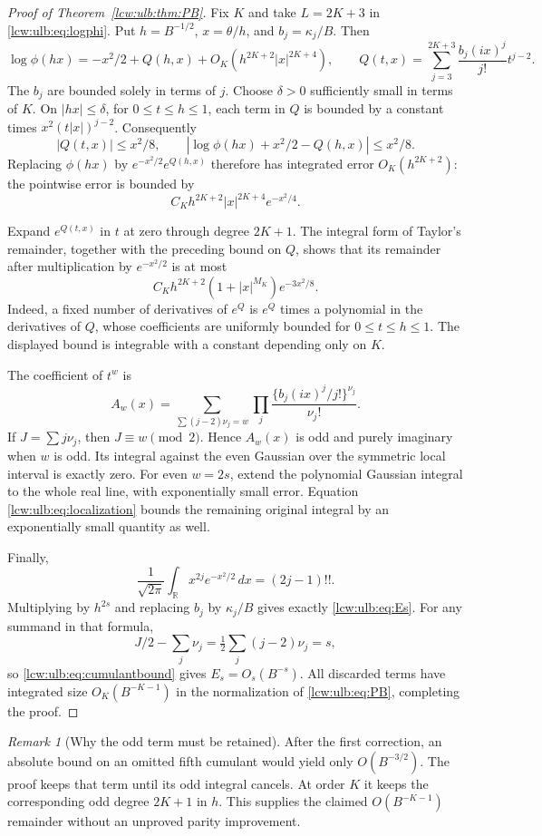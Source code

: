 \documentclass[11pt,letterpaper]{article}
\theoremstyle{remark}\newtheorem{remark}[theorem]{Remark}
\newcommand{\R}{\mathbb R}
\begin{document}
\begin{proof}[Proof of Theorem~\ref{lcw:ulb:thm:PB}]
Fix $K$ and take $L=2K+3$ in \eqref{lcw:ulb:eq:logphi}. Put
$h=B^{-1/2}$, $x=\theta/h$, and $b_j=\kappa_j/B$. Then
\[
 \log\phi(hx)=-x^2/2+Q(h,x)
      +O_K(h^{2K+2}|x|^{2K+4}),
 \qquad
 Q(t,x)=\sum_{j=3}^{2K+3}\frac{b_j(ix)^j}{j!}t^{j-2}.
\]
The $b_j$ are bounded solely in terms of $j$. Choose $\delta>0$
sufficiently small in terms of $K$. On $|hx|\le\delta$, for
$0\le t\le h\le1$, each term in $Q$ is bounded by a constant
times $x^2(t|x|)^{j-2}$. Consequently
\[
 |Q(t,x)|\le x^2/8,
 \qquad
 |\log\phi(hx)+x^2/2-Q(h,x)|\le x^2/8.
\]
Replacing $\phi(hx)$ by $e^{-x^2/2}e^{Q(h,x)}$ therefore has
integrated error $O_K(h^{2K+2})$: the pointwise error is bounded by
\[
 C_K h^{2K+2}|x|^{2K+4}e^{-x^2/4}.
\]

Expand $e^{Q(t,x)}$ in $t$ at zero through degree $2K+1$.
The integral form of Taylor's remainder, together with the preceding
bound on $Q$, shows that its remainder after multiplication by
$e^{-x^2/2}$ is at most
\[
 C_Kh^{2K+2}(1+|x|^{M_K})e^{-3x^2/8}.
\]
Indeed, a fixed number of derivatives of $e^Q$ is $e^Q$ times
a polynomial in the derivatives of $Q$, whose coefficients are
uniformly bounded for $0\le t\le h\le1$. The displayed bound
is integrable with a constant depending only on $K$.

The coefficient of $t^w$ is
\[
 A_w(x)=\sum_{\sum(j-2)\nu_j=w}
       \prod_j\frac{\{b_j(ix)^j/j!\}^{\nu_j}}{\nu_j!}.
\]
If $J=\sum j\nu_j$, then $J\equiv w\pmod2$. Hence $A_w(x)$
is odd and purely imaginary when $w$ is odd. Its integral against
the even Gaussian over the symmetric local interval is exactly zero.
For even $w=2s$, extend the polynomial Gaussian integral to the
whole real line, with exponentially small error. Equation
\eqref{lcw:ulb:eq:localization} bounds the remaining original integral
by an exponentially small quantity as well.

Finally,
\[
 \frac1{\sqrt{2\pi}}\int_{\R}x^{2j}e^{-x^2/2}\,dx=(2j-1)!!.
\]
Multiplying by $h^{2s}$ and replacing $b_j$ by $\kappa_j/B$
gives exactly \eqref{lcw:ulb:eq:Es}. For any summand in that formula,
\[
 J/2-\sum_j\nu_j=\tfrac12\sum_j(j-2)\nu_j=s,
\]
so \eqref{lcw:ulb:eq:cumulantbound} gives $E_s=O_s(B^{-s})$.
All discarded terms have integrated size $O_K(B^{-K-1})$ in the
normalization of \eqref{lcw:ulb:eq:PB}, completing the proof.
\end{proof}

\begin{remark}[Why the odd term must be retained]
After the first correction, an absolute bound on an omitted fifth
cumulant would yield only $O(B^{-3/2})$. The proof keeps that term
until its odd integral cancels. At order $K$ it keeps the corresponding
odd degree $2K+1$ in $h$. This supplies the claimed $O(B^{-K-1})$
remainder without an unproved parity improvement.
\end{remark}
\end{document}
